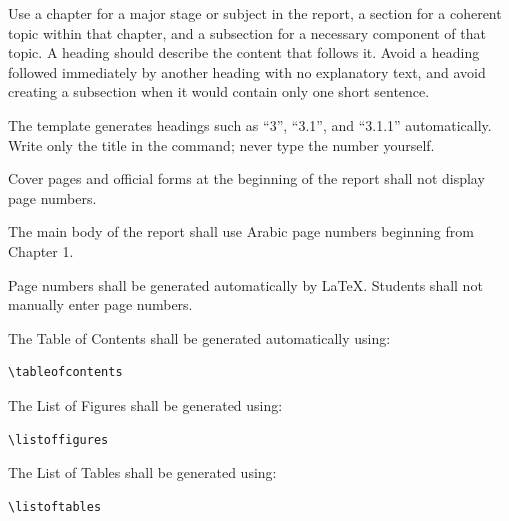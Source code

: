 {\begin{itemize}[leftmargin=0.8cm, itemsep=3pt]
\end{itemize}


Use a chapter for a major stage or subject in the report, a section
for a coherent topic within that chapter, and a subsection for a
necessary component of that topic. A heading should describe the
content that follows it. Avoid a heading followed immediately by
another heading with no explanatory text, and avoid creating a
subsection when it would contain only one short sentence.

\RegExample The template generates headings such as ``3'', ``3.1'',
and ``3.1.1'' automatically. Write only the title in the command;
never type the number yourself.

\vspace{0.3cm}



Cover pages and official forms at the beginning of the report shall
not display page numbers.

The main body of the report shall use Arabic page numbers beginning
from Chapter 1.

Page numbers shall be generated automatically by \LaTeX{}.
Students shall not manually enter page numbers.

\vspace{0.3cm}



The Table of Contents shall be generated automatically using:

\begin{verbatim}
\tableofcontents
\end{verbatim}

The List of Figures shall be generated using:

\begin{verbatim}
\listoffigures
\end{verbatim}

The List of Tables shall be generated using:

\begin{verbatim}
\listoftables
\end{verbatim}

}
